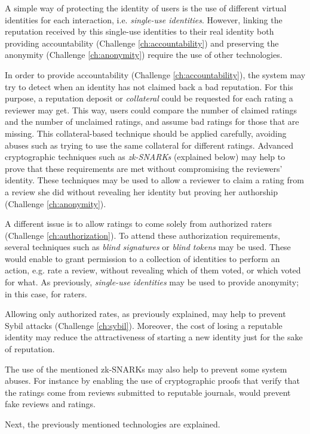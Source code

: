 A simple way of protecting the identity of users is the use of different virtual
identities for each interaction, i.e. \emph{single-use identities}. However,
linking the reputation received by this single-use identities to their real
identity both providing accountability (Challenge \ref{ch:accountability}) and
preserving the anonymity (Challenge \ref{ch:anonymity}) require the use of other
technologies.

In order to provide accountability (Challenge \ref{ch:accountability}), the
system may try to detect when an identity has not claimed back a bad reputation.
For this purpose, a reputation deposit or \emph{collateral} could be requested
for each rating a reviewer may get. This way, users could compare the number of
claimed ratings and the number of unclaimed ratings, and assume bad ratings for
those that are missing. This collateral-based technique should be applied
carefully, avoiding abuses such as trying to use the same collateral for
different ratings. Advanced cryptographic techniques such as \emph{zk-SNARKs}
(explained below) may help to prove that these requirements are met without
compromising the reviewers' identity. These techniques may be used to allow a
reviewer to claim a rating from a review she did without revealing her identity
but proving her authorship (Challenge \ref{ch:anonymity}).

A different issue is to allow ratings to come solely from authorized raters
(Challenge \ref{ch:authorization}). To attend these authorization requirements,
several techniques such as \emph{blind signatures} or \emph{blind tokens} may be
used. These would enable to grant permission to a collection of identities to
perform an action, e.g. rate a review, without revealing which of them voted, or
which voted for what. As previously, \emph{single-use identities} may be used to
provide anonymity; in this case, for raters.

Allowing only authorized rates, as previously explained, may help to prevent
Sybil attacks (Challenge \ref{ch:sybil}). Moreover, the cost of losing a
reputable identity may reduce the attractiveness of starting a new identity just
for the sake of reputation.

The use of the mentioned zk-SNARKs may also help to prevent some system abuses.
For instance by enabling the use of cryptographic proofs that verify that the
ratings come from reviews submitted to reputable journals, would prevent fake
reviews and ratings.

Next, the previously mentioned technologies are explained.

